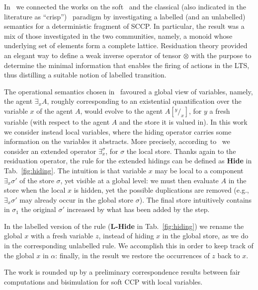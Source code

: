 \documentclass[submission,copyright,creativecommons]{eptcs}
\begin{document}
In~\cite{coord} we connected the works on the soft~\cite{scc} and the classical 
(also indicated in the literature as ``crisp'')~\cite{pippo,popl91} 
paradigm by investigating
a labelled (and an unlabelled) semantics for a deterministic fragment of SCCP. In particular, the result 
was a mix of those investigated in the two communities, namely, a monoid whose underlying set of elements
form a complete lattice.  Residuation theory 
provided an elegant way to define a weak inverse operator of tensor $\otimes$ with the purpose to  determine the 
minimal information that enables the firing of actions in the LTS, thus distilling a suitable notion of labelled transition.

The operational semantics chosen in~\cite{coord} favoured a global view of  variables, namely, the agent $\exists_x A$, roughly 
corresponding to an existential quantification over the variable $x$ of the agent $A$, would evolve to the agent 
$A[^y/_x]$, for $y$ a fresh variable (with respect to the agent $A$ and the store it is valued in).
In this work we consider instead local variables, where the hiding operator carries some information on the variables it abstracts.
More precisely, according to~\cite{extendedHiding} we consider an extended operator $\exists_x^\sigma$, for $\sigma$ the local store.
Thanks again to the residuation operator, the rule for the extended hidings can be defined as {\bf Hide} in Tab.~\ref{fig:hiding}. The intuition is that variable $x$ may be local to a component $\exists_x \sigma'$ of the store $\sigma$, yet visible at a global level: we must then evaluate $A$ in the store
when the local $x$ is hidden, yet the possible duplications are removed (e.g., $\exists_x \sigma'$ may already occur in the global store $\sigma$). The final store intuitively contains in $\sigma_1$ the original $\sigma'$ increased by what has been added by the step. 

In the labelled version of the rule ({\bf L-Hide} in Tab.~\ref{fig:hiding}) we rename the global $x$ with a fresh variable $z$, instead of hiding $x$ in the global store, as we do in the corresponding unlabelled rule. We accomplish this in order
to keep track of the global $x$ in $\alpha$: finally, in the result we restore the occurrences of $z$ back to $x$.

The work is rounded up by a preliminary correspondence results between fair computations and bisimulation for soft CCP with 
local variables.

%
\end{document}
